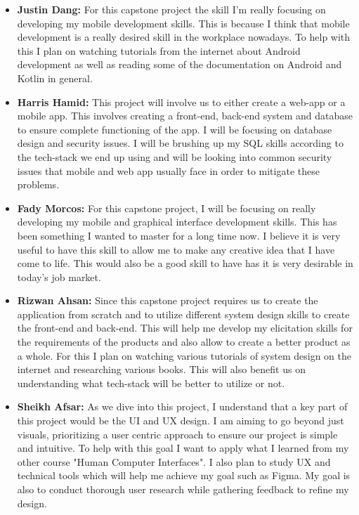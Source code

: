\documentclass[12pt]{article}
\begin{document}
\begin{itemize}
    \item \textbf{Justin Dang:} For this capstone project the skill I'm really focusing on developing my mobile development skills. This is because I think that mobile development is a really desired skill in the workplace nowadays. To help with this I plan on watching tutorials from the internet about Android development as well as reading some of the documentation on Android and Kotlin in general.
    \item \textbf{Harris Hamid:} This project will involve us to either create a web-app or a mobile app. This involves creating a front-end, back-end system and database to ensure complete functioning of the app. I will be focusing on database design and security issues. I will be brushing up my SQL skills according to the tech-stack we end up using and will be looking into common security issues that mobile and web app usually face in order to mitigate these problems.
    \item \textbf{Fady Morcos:} For this capstone project, I will be focusing on really developing my mobile and graphical interface development skills. This has been something I wanted to master for a long time now. I believe it is very useful to have this skill to allow me to make any creative idea that I have come to life. This would also be a good skill to have has it is very desirable in today's job market. 
    \item \textbf{Rizwan Ahsan:} Since this capstone project requires us to create the application from scratch and to utilize different system design skills to create the front-end and back-end. This will help me develop my elicitation skills for the requirements of the products and also allow to create a better product as a whole. For this I plan on watching various tutorials of system design on the internet and researching various books. This will also benefit us on understanding what tech-stack will be better to utilize or not.
    \item \textbf{Sheikh Afsar:} As we dive into this project, I understand that a key part of this project would be the UI and UX design. I am aiming to go beyond just visuals, prioritizing a user centric approach to ensure our project is simple and intuitive. To help with this goal I want to apply what I learned from my other course "Human Computer Interfaces". I also plan to study UX and technical tools which will help me achieve my goal such as Figma. My goal is also to conduct thorough user research while gathering feedback to refine my design.
\end{itemize}
\end{document}
